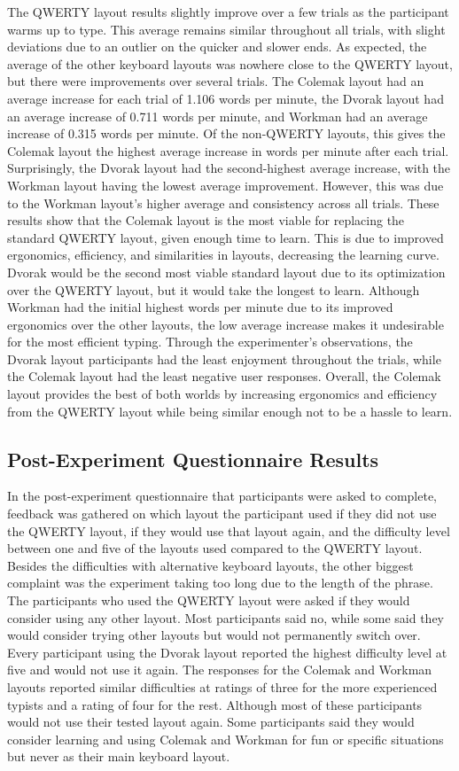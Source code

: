 \documentclass[manuscript,screen,review]{acmart}
\begin{document}
        The QWERTY layout results slightly improve over a few trials as the participant warms up to type. This average remains similar throughout all trials, with slight deviations due to an outlier on the quicker and slower ends. As expected, the average of the other keyboard layouts was nowhere close to the QWERTY layout, but there were improvements over several trials. The Colemak layout had an average increase for each trial of 1.106 words per minute, the Dvorak layout had an average increase of 0.711 words per minute, and Workman had an average increase of 0.315 words per minute. Of the non-QWERTY layouts, this gives the Colemak layout the highest average increase in words per minute after each trial. Surprisingly, the Dvorak layout had the second-highest average increase, with the Workman layout having the lowest average improvement. However, this was due to the Workman layout's higher average and consistency across all trials. These results show that the Colemak layout is the most viable for replacing the standard QWERTY layout, given enough time to learn. This is due to improved ergonomics, efficiency, and similarities in layouts, decreasing the learning curve. Dvorak would be the second most viable standard layout due to its optimization over the QWERTY layout, but it would take the longest to learn. Although Workman had the initial highest words per minute due to its improved ergonomics over the other layouts, the low average increase makes it undesirable for the most efficient typing. Through the experimenter's observations, the Dvorak layout participants had the least enjoyment throughout the trials, while the Colemak layout had the least negative user responses. Overall, the Colemak layout provides the best of both worlds by increasing ergonomics and efficiency from the QWERTY layout while being similar enough not to be a hassle to learn. 
    \subsection{Post-Experiment Questionnaire Results}
        In the post-experiment questionnaire that participants were asked to complete, feedback was gathered on which layout the participant used if they did not use the QWERTY layout, if they would use that layout again, and the difficulty level between one and five of the layouts used compared to the QWERTY layout. Besides the difficulties with alternative keyboard layouts, the other biggest complaint was the experiment taking too long due to the length of the phrase. The participants who used the QWERTY layout were asked if they would consider using any other layout. Most participants said no, while some said they would consider trying other layouts but would not permanently switch over. Every participant using the Dvorak layout reported the highest difficulty level at five and would not use it again. The responses for the Colemak and Workman layouts reported similar difficulties at ratings of three for the more experienced typists and a rating of four for the rest. Although most of these participants would not use their tested layout again. Some participants said they would consider learning and using Colemak and Workman for fun or specific situations but never as their main keyboard layout.
        
\end{document}
